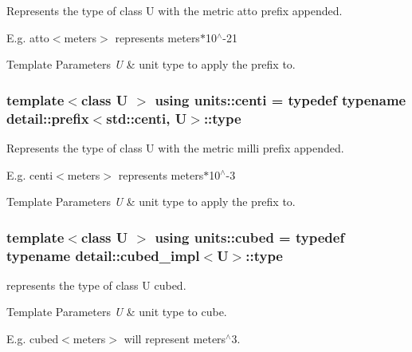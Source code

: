 Represents the type of {\ttfamily class U} with the metric \textquotesingle{}atto\textquotesingle{} prefix appended. 

E.\+g. atto$<$meters$>$ represents meters$\ast$10$^\wedge$-\/21 
\begin{DoxyTemplParams}{Template Parameters}
{\em U} & unit type to apply the prefix to. \\
\hline
\end{DoxyTemplParams}
\hypertarget{group___unit_manipulators_ga33baefb1c4e794428d7ef77467a8b13e}{}
\subsubsection[{centi}]{\setlength{\rightskip}{0pt plus 5cm}template$<$class U $>$ using {\bf units\+::centi} = typedef typename detail\+::prefix$<$std\+::centi, U$>$\+::type}\label{group___unit_manipulators_ga33baefb1c4e794428d7ef77467a8b13e}


Represents the type of {\ttfamily class U} with the metric \textquotesingle{}milli\textquotesingle{} prefix appended. 

E.\+g. centi$<$meters$>$ represents meters$\ast$10$^\wedge$-\/3 
\begin{DoxyTemplParams}{Template Parameters}
{\em U} & unit type to apply the prefix to. \\
\hline
\end{DoxyTemplParams}
\hypertarget{group___unit_manipulators_gad3e94dc693fe45a580b382cb666434a1}{}
\subsubsection[{cubed}]{\setlength{\rightskip}{0pt plus 5cm}template$<$class U $>$ using {\bf units\+::cubed} = typedef typename detail\+::cubed\+\_\+impl$<$U$>$\+::type}\label{group___unit_manipulators_gad3e94dc693fe45a580b382cb666434a1}


represents the type of {\ttfamily class U} cubed. 


\begin{DoxyTemplParams}{Template Parameters}
{\em U} & {\ttfamily unit} type to cube.\\
\hline
\end{DoxyTemplParams}
E.\+g. {\ttfamily cubed$<$meters$>$} will represent meters$^\wedge$3. \hypertarget{group___unit_manipulators_ga610922a1098c1f783d7c6972bbfe59f8}{}
